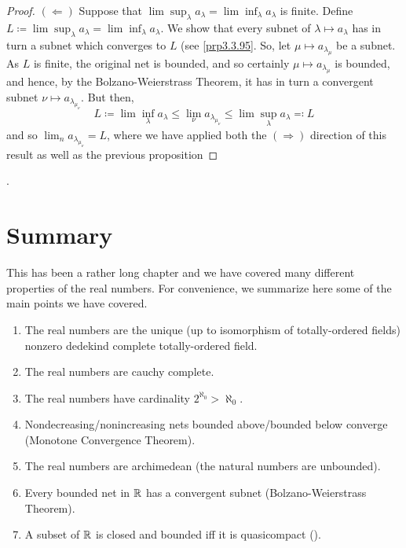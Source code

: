 \begin{prp}
\begin{proof}
\blankline
\noindent
$(\Leftarrow )$ Suppose that $\lim \sup _\lambda a_\lambda =\lim \inf _\lambda a_\lambda$  is finite.  Define $L\coloneqq \lim \sup _\lambda a_\lambda =\lim \inf _\lambda a_\lambda$.  We show that every subnet of $\lambda \mapsto a_\lambda$ has in turn a subnet which converges to $L$ (see \cref{prp3.3.95}.  So, let $\mu \mapsto a_{\lambda _\mu}$ be a subnet.  As $L$ is finite, the original net is bounded, and so certainly $\mu \mapsto a_{\lambda _\mu}$ is bounded, and hence, by the Bolzano-Weierstrass Theorem, it has in turn a convergent subnet $\nu \mapsto a_{\lambda _{\mu _\nu}}$.  But then,
\begin{equation}
L\coloneqq \lim \inf _\lambda a_\lambda \leq \lim _\nu a_{\lambda _{\mu _\nu}}\leq \lim \sup _\lambda a_\lambda \eqqcolon L
\end{equation}
and so $\lim _na_{\lambda _{\mu _\nu}}=L$, where we have applied both the $(\Rightarrow )$ direction of this result as well as the previous proposition
\end{proof}.
\end{prp}

\section{Summary}

This has been a rather long chapter and we have covered many different properties of the real numbers.  For convenience, we summarize here some of the main points we have covered.
\begin{enumerate}
\item The real numbers are the unique (up to isomorphism of totally-ordered fields) nonzero dedekind complete totally-ordered field.
\item The real numbers are cauchy complete.
\item The real numbers have cardinality $2^{\aleph _0}>
\aleph _0$.
\item Nondecreasing/nonincreasing nets bounded above/bounded below converge (Monotone Convergence Theorem).
\item The real numbers are archimedean (the natural numbers are unbounded).
\item Every bounded net in $\mathbb{R}$ has a convergent subnet (Bolzano-Weierstrass Theorem).
\item A subset of $\mathbb{R}$ is closed and bounded iff it is quasicompact ().
\end{enumerate}